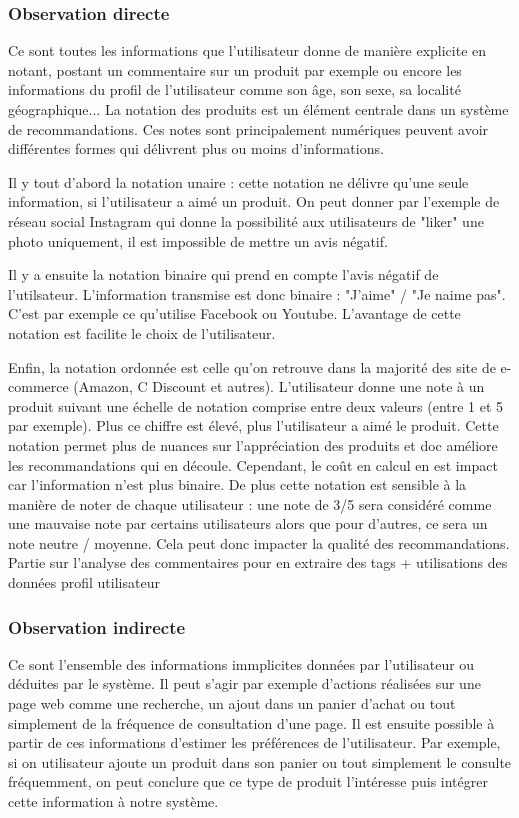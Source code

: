 \documentclass{report}
\begin{document}
\subsubsection{Observation directe}
Ce sont toutes les informations que l'utilisateur donne de manière explicite en notant, postant un commentaire sur un produit par exemple ou encore les informations du profil de l'utilisateur comme son âge, son sexe, sa localité géographique...
La notation des produits est un élément centrale dans un système de recommandations. Ces notes sont principalement numériques peuvent avoir différentes formes qui délivrent plus ou moins d'informations.
\vspace{0.5cm}
\par Il y tout d'abord la notation unaire : cette notation ne délivre qu'une seule information, si l'utilisateur a aimé un produit. On peut donner par l'exemple de réseau social Instagram qui donne la possibilité aux utilisateurs de "liker" une photo uniquement, il est impossible de mettre un avis négatif.
\par Il y a ensuite la notation binaire  qui prend en compte l'avis négatif de l'utilsateur. L'information transmise est donc binaire : "J'aime" / "Je naime pas". C'est par exemple ce qu'utilise Facebook ou Youtube. L'avantage de cette notation est facilite le choix de l'utilisateur.
\par Enfin, la notation ordonnée est celle qu'on retrouve dans la majorité des site de e-commerce (Amazon, C Discount et autres). L'utilisateur donne une note à un produit suivant une échelle de notation comprise entre deux valeurs (entre 1 et 5 par exemple). Plus ce chiffre est élevé, plus l'utilisateur a aimé le produit. Cette notation permet plus de nuances sur l'appréciation des produits et doc améliore les recommandations qui en découle.
Cependant, le coût en calcul en est impact car l'information n'est plus binaire. De plus cette notation est sensible à la manière de noter de chaque utilisateur : une note de 3/5 sera considéré comme une mauvaise note par certains utilisateurs alors que pour d'autres, ce sera un note neutre / moyenne. Cela peut donc impacter la qualité des recommandations.
\vspace{0.5cm}
Partie sur l'analyse des commentaires pour en extraire des tags + utilisations des données profil utilisateur
\subsubsection{Observation indirecte}
Ce sont l'ensemble des informations immplicites données par l'utilisateur ou déduites par le système. Il peut s'agir par exemple d'actions réalisées sur une page web comme une recherche, un ajout dans un panier d'achat ou tout simplement de la fréquence de consultation d'une page. Il est ensuite possible à partir de ces informations d'estimer les préférences de l'utilisateur. Par exemple, si on utilisateur ajoute un produit dans son panier ou tout simplement le consulte fréquemment, on peut conclure que ce type de produit l'intéresse puis intégrer cette information à notre système.
\end{document}
